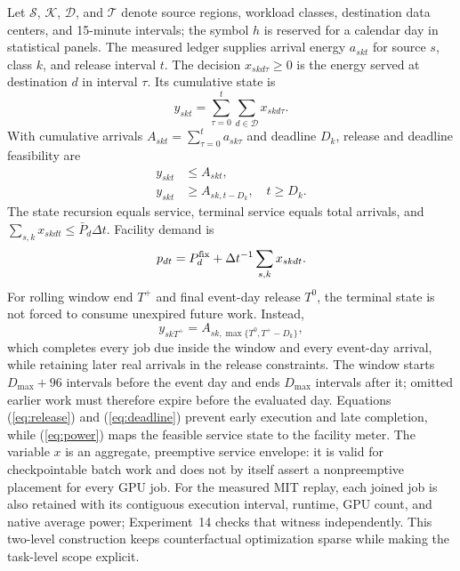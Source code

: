\documentclass[10pt,journal]{IEEEtran}
\newcommand{\dt}{\Delta t}
\begin{document}
Let $\mathcal S$, $\mathcal K$, $\mathcal D$, and $\mathcal T$ denote source
regions, workload classes, destination data centers, and 15-minute intervals;
the symbol $h$ is reserved for a calendar day in statistical panels.
The measured ledger supplies arrival energy $a_{skt}$ for source $s$, class
$k$, and release interval $t$. The decision $x_{skd\tau}\geq0$ is the energy
served at destination $d$ in interval $\tau$. Its cumulative state is
\begin{equation}
 y_{skt}=\sum_{\tau=0}^{t}\sum_{d\in\mathcal D}x_{skd\tau}.
 \label{eq:cumulative}
\end{equation}
With cumulative arrivals $A_{skt}=\sum_{\tau=0}^{t}a_{sk\tau}$ and deadline
$D_k$, release and deadline feasibility are
\begin{align}
 y_{skt}&\leq A_{skt}, \label{eq:release}\\
 y_{skt}&\geq A_{sk,t-D_k},\quad t\geq D_k. \label{eq:deadline}
\end{align}
The state recursion equals service, terminal service equals total arrivals, and
$\sum_{s,k}x_{skdt}\leq\bar P_d\dt$. Facility demand is
\begin{equation}
 p_{dt}=P_d^{\rm fix}+\dt^{-1}\sum_{s,k}x_{skdt}.
 \label{eq:power}
\end{equation}
For rolling window end $T^+$ and final event-day release $T^0$, the terminal
state is not forced to consume unexpired future work. Instead,
\begin{equation}
y_{skT^+}=A_{sk,\max\{T^0,T^+-D_k\}},
\label{eq:rollingterminal}
\end{equation}
which completes every job due inside the window and every event-day arrival,
while retaining later real arrivals in the release constraints. The window
starts $D_{\max}+96$ intervals before the event day and ends $D_{\max}$
intervals after it; omitted earlier work must therefore expire before the
evaluated day.
Equations (\ref{eq:release}) and (\ref{eq:deadline}) prevent early execution
and late completion, while (\ref{eq:power}) maps the feasible service state to
the facility meter.
The variable \(x\) is an aggregate, preemptive service envelope: it is valid
for checkpointable batch work and does not by itself assert a nonpreemptive
placement for every GPU job. For the measured MIT replay, each joined job is
also retained with its contiguous execution interval, runtime, GPU count, and
native average power; Experiment~14 checks that witness independently. This
two-level construction keeps counterfactual optimization sparse while making
the task-level scope explicit.
\end{document}
